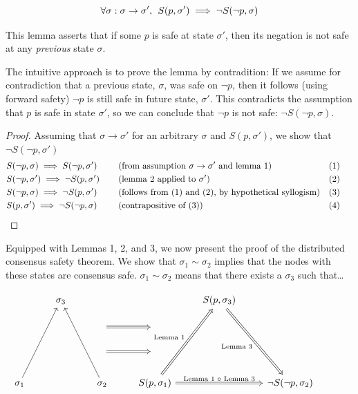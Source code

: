 \documentclass{article}
\theoremstyle{definition}
\begin{document}
\begin{lemma}
$$
\forall \sigma:\sigma \to \sigma',\hspace{1.5mm} S(p,\sigma') \implies \neg{S(\neg{p},\sigma)}
$$
\end{lemma}

This lemma asserts that if some $p$ is safe at state $\sigma'$, then its negation is not safe at any \emph{previous} state $\sigma$.

The intuitive approach is to prove the lemma by contradition: If we assume for contradiction that a previous state, $\sigma$, was safe on $\neg{p}$, then it follows (using forward safety) $\neg{p}$ is still safe in future state, $\sigma'$. This contradicts the assumption that $p$ is safe in state $\sigma'$, so we can conclude that $\neg{p}$ is not safe: $\neg{S(\neg{p},\sigma)}$.

\begin{proof}
  Assuming that $\sigma \to \sigma'$ for an arbitrary $\sigma$ and $S(p,\sigma')$, we show that $\neg{S(\neg{p},\sigma')}$
  \begin{align*}
    &S(\neg{p},\sigma) \implies S(\neg{p},\sigma') &&\text{(from assumption $\sigma \to \sigma'$ and lemma 1)}   &&\text{(1)} \\
    &S(\neg{p},\sigma') \implies \neg{S(p,\sigma')} &&\text{(lemma 2 applied to $\sigma'$) }   &&\text{(2)} \\
    &S(\neg{p},\sigma) \implies \neg{S(p,\sigma')} &&\text{(follows from (1) and (2), by hypothetical syllogism)} &&\text{(3)} \\
    &S(p,\sigma') \implies \neg{S(\neg{p},\sigma)} \hspace{5mm} \qedhere &&\text{(contrapositive of (3))} &&\text{(4)} \hspace{5mm}
  \end{align*}
\end{proof}

\vspace{5mm}

Equipped with Lemmas 1, 2, and 3, we now present the proof of the distributed consensus safety theorem. We show that $\sigma_1 \sim \sigma_2$ implies that the nodes with these states are consensus safe. $\sigma_1 \sim \sigma_2$ means that there exists a $\sigma_3$ such that\ldots


\begin{equation*}
\begin{tikzcd}
{}
  &
\sigma_3
  &
{}
  &
{}
  &
S(p,\sigma_3)
  &
{}
  &
{}
  \\ 
{}
  &
{}
  &
{}
  \arrow[r,Rightarrow,""]
  &
{}
  &
{}
  &
{}
  &
{}
  \\
{}
  &
{}
  &
{}
  \arrow[r,Rightarrow,""]
  &
{}
  &
{}
  &
{}
  &
{}
  \\
\sigma_1
  \arrow[uuur,""]
  &
{}
  &
\sigma_2
  \arrow[uuul,""]
{}
  &
S(p,\sigma_1)
  \arrow[uuur,Rightarrow,"\text{Lemma 1}"]
  \arrow[rr,Rightarrow,"\text{Lemma 1 $\circ$ Lemma 3}"]
  &
{}
  &
\neg{S(\neg{p},\sigma_2)}
  \arrow[uuul,Leftarrow,"\text{Lemma 3}"] 
\end{tikzcd}
\end{equation*}
\end{document}
